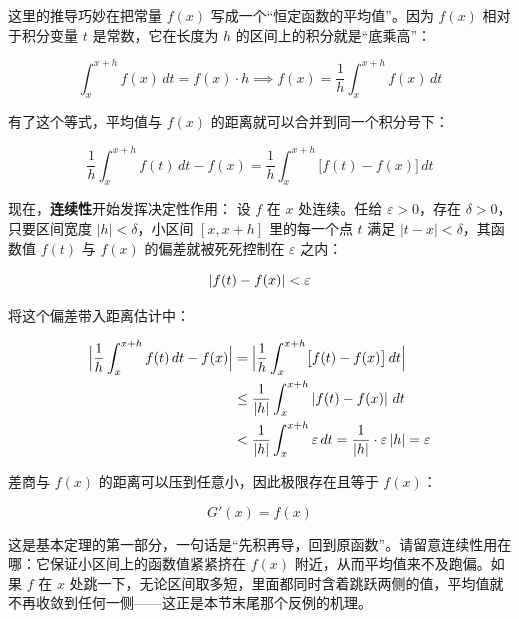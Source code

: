 这里的推导巧妙在把常量 \(f(x)\) 写成一个``恒定函数的平均值''。因为 \(f(x)\) 相对于积分变量 \(t\) 是常数，它在长度为 \(h\) 的区间上的积分就是``底乘高''：


\[
\int_x^{x+h} f(x)\,dt = f(x) \cdot h \implies f(x) = \frac1h\int_x^{x+h} f(x)\,dt
\]


有了这个等式，平均值与 \(f(x)\) 的距离就可以合并到同一个积分号下：


\[
\frac1h\int_x^{x+h} f(t)\,dt - f(x) = \frac1h\int_x^{x+h} \bigl[f(t)-f(x)\bigr]\,dt
\]


现在，\textbf{连续性}开始发挥决定性作用：
设 \(f\) 在 \(x\) 处连续。任给 \(\varepsilon>0\)，存在 \(\delta>0\)，只要区间宽度 \(\vert{}h\vert{}<\delta\)，小区间 \([x,x+h]\) 里的每一个点 \(t\) 满足 \(\vert{}t-x\vert{}<\delta\)，其函数值 \(f(t)\) 与 \(f(x)\) 的偏差就被死死控制在 \(\varepsilon\) 之内：


\[
\left|f(t)-f(x)\right| < \varepsilon
\]


将这个偏差带入距离估计中：


\[
\begin{aligned}
\Bigl\vert{}\frac1h\int_x^{x+h} f(t)\,dt-f(x)\Bigr\vert{} &= \Bigl\vert{}\frac1h\int_x^{x+h}\bigl[f(t)-f(x)\bigr]\,dt\Bigr\vert{} \\
&\le \frac1{\left|h\right|}\int_x^{x+h}\left|f(t)-f(x)\right|\,dt \\
&< \frac1{\left|h\right|}\int_x^{x+h}\varepsilon\,dt = \frac1{\left|h\right|} \cdot \varepsilon\left|h\right| = \varepsilon
\end{aligned}
\]


差商与 \(f(x)\) 的距离可以压到任意小，因此极限存在且等于 \(f(x)\)：


\[
G'(x)=f(x)
\]

这是基本定理的第一部分，一句话是``先积再导，回到原函数''。请留意连续性用在哪：它保证小区间上的函数值紧紧挤在 \(f(x)\) 附近，从而平均值来不及跑偏。如果 \(f\) 在 \(x\) 处跳一下，无论区间取多短，里面都同时含着跳跃两侧的值，平均值就不再收敛到任何一侧——这正是本节末尾那个反例的机理。

